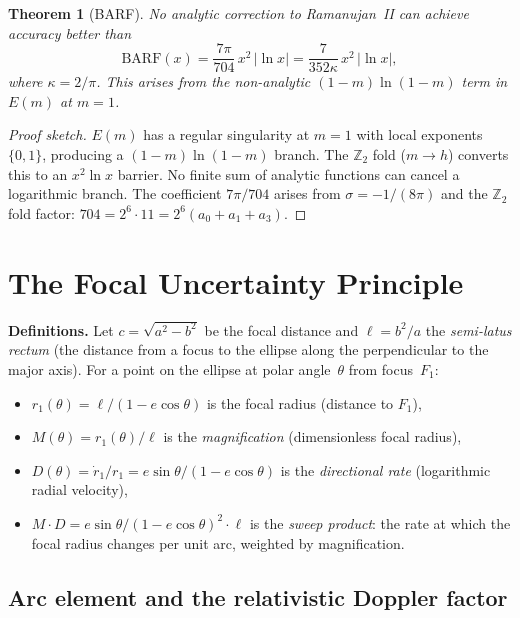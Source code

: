 \documentclass[12pt]{article}
\newtheorem{theorem}{Theorem}[section]
\begin{document}
\begin{theorem}[BARF]
No analytic correction to Ramanujan~II can achieve accuracy better than
\[
\text{BARF}(x) = \frac{7\pi}{704}\,x^2\,|\!\ln x| = \frac{7}{352\kappa}\,x^2\,|\!\ln x|,
\]
where $\kappa = 2/\pi$. This arises from the non-analytic $(1{-}m)\ln(1{-}m)$ term in $E(m)$ at $m=1$.
\end{theorem}

\begin{proof}[Proof sketch]
$E(m)$ has a regular singularity at $m=1$ with local exponents $\{0,1\}$, producing a $(1-m)\ln(1-m)$ branch. The $\mathbb{Z}_2$ fold ($m \to h$) converts this to an $x^2\ln x$ barrier. No finite sum of analytic functions can cancel a logarithmic branch.
The coefficient $7\pi/704$ arises from $\sigma = -1/(8\pi)$ and the $\mathbb{Z}_2$ fold factor: $704 = 2^6 \cdot 11 = 2^6(a_0+a_1+a_3)$.
\end{proof}

\section{The Focal Uncertainty Principle}\label{sec:focal}

\noindent\textbf{Definitions.} Let $c = \sqrt{a^2 - b^2}$ be the focal distance and $\ell = b^2/a$ the \emph{semi-latus rectum} (the distance from a focus to the ellipse along the perpendicular to the major axis). For a point on the ellipse at polar angle~$\theta$ from focus~$F_1$:
\begin{itemize}
\item $r_1(\theta) = \ell/(1 - e\cos\theta)$ is the focal radius (distance to $F_1$),
\item $M(\theta) = r_1(\theta)/\ell$ is the \emph{magnification} (dimensionless focal radius),
\item $D(\theta) = \dot{r}_1/r_1 = e\sin\theta/(1-e\cos\theta)$ is the \emph{directional rate} (logarithmic radial velocity),
\item $M\!\cdot\!D = e\sin\theta/(1-e\cos\theta)^2 \cdot \ell$ is the \emph{sweep product}: the rate at which the focal radius changes per unit arc, weighted by magnification.
\end{itemize}

\subsection{Arc element and the relativistic Doppler factor}
\end{document}
